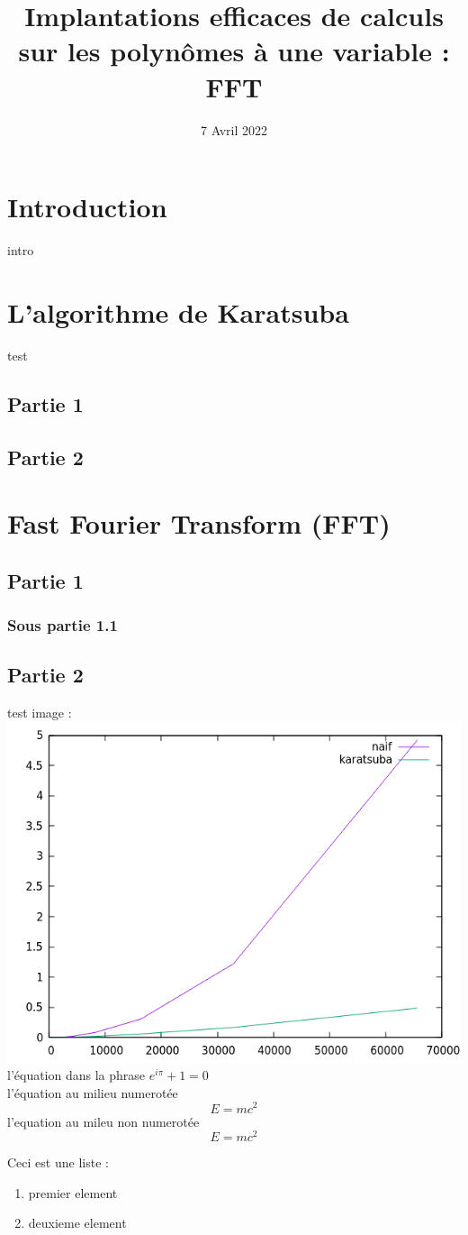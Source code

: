 \documentclass[12pt, a4paper]{report}
\title{Implantations efficaces de calculs sur les polynômes à une variable : FFT}
\author{}
\date{7 Avril 2022}
\begin{document}
\maketitle
\tableofcontents
\newpage

\chapter*{Introduction}
intro


\chapter{L'algorithme de Karatsuba}
test
\section{Partie 1}

\section{Partie 2}

\chapter{Fast Fourier Transform (FFT)}
\section{Partie 1}
\subsection{Sous partie 1.1}
\section{Partie 2}

test
image :\\
\includegraphics[scale=1]{naif_kara}\\

l'équation dans la phrase $e^{i\pi}+1 = 0$\\
l'équation au milieu numerotée
\begin{equation}
E=mc^2
\end{equation}
l'equation au mileu non numerotée
\[ E=mc^2 \]

Ceci est une liste :
\begin{enumerate}
  \item premier element
  \item deuxieme element
\end{enumerate}
\end{document}
